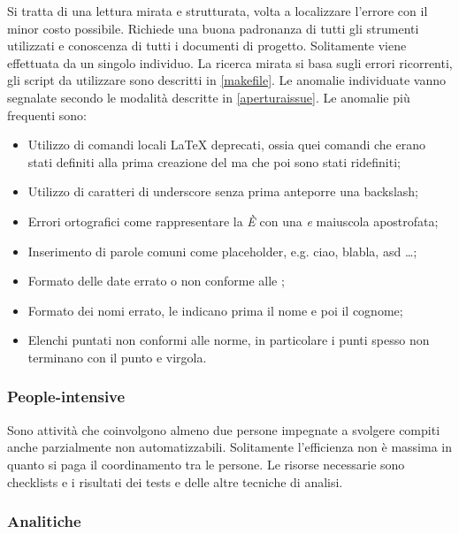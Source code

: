 			Si tratta di una lettura mirata e strutturata, volta a localizzare l'errore con il minor costo possibile. Richiede una buona padronanza di tutti gli strumenti utilizzati e conoscenza di tutti i documenti di progetto. Solitamente viene effettuata da un singolo individuo. La ricerca mirata si basa sugli errori ricorrenti, gli script da utilizzare sono descritti in \ref{makefile}. Le anomalie individuate vanno segnalate secondo le modalità descritte in \ref{aperturaissue}.
			Le anomalie più frequenti sono:
			\begin{itemize}
				\item Utilizzo di comandi locali \LaTeX{} deprecati, ossia quei comandi che erano stati definiti alla prima creazione del  ma che poi sono stati ridefiniti;
				\item Utilizzo di caratteri di underscore senza prima anteporre una backslash;
				\item Errori ortografici come rappresentare la \emph{È} con una \emph{e} maiuscola apostrofata;
				\item Inserimento di parole comuni come placeholder, e.g. c{}i{}a{}o, b{}l{}a{}b{}l{}a, a{}s{}d \dots; %
				\item Formato delle date errato o non conforme alle \NormeDiProgetto{};
				\item Formato dei nomi errato, le \NormeDiProgetto{} indicano prima il nome e poi il cognome;
				\item Elenchi puntati non conformi alle norme, in particolare i punti spesso non terminano con il punto e virgola.
				

			\end{itemize}
			
			
		\subsubsection{People-intensive}

		Sono attività che coinvolgono almeno due persone impegnate a svolgere compiti anche parzialmente non automatizzabili. Solitamente l'efficienza non è massima in quanto si paga il coordinamento tra le persone. Le risorse necessarie sono checklists e i risultati dei tests e delle altre tecniche di analisi.
	
		\subsubsection{Analitiche}

